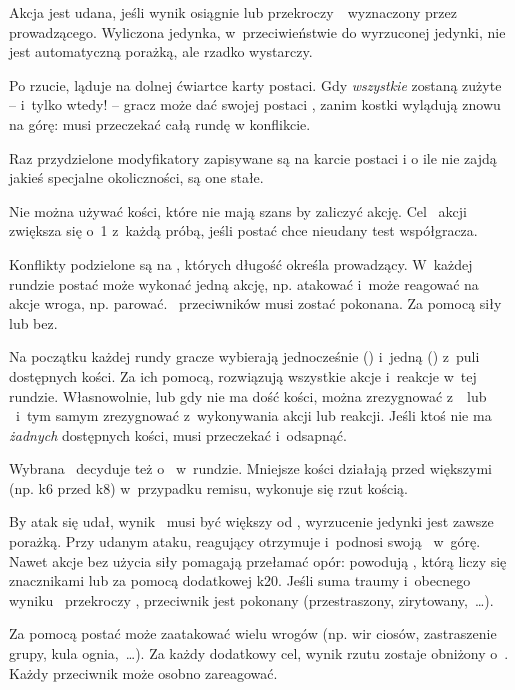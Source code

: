 {		\noindent
		Akcja jest udana, jeśli wynik osiągnie lub przekroczy \,\TN\ wyznaczony przez prowadzącego. Wyliczona jedynka, w~przeciwieństwie do wyrzuconej jedynki, nie jest automatyczną porażką, ale rzadko wystarczy.

		\nipajinTableTargets

		\noindent
		Po rzucie,  ląduje na dolnej ćwiartce karty postaci. Gdy \emph{wszystkie} zostaną zużyte -- i~tylko wtedy! -- gracz może dać swojej postaci , zanim kostki wylądują znowu na górę: musi przeczekać całą rundę w konflikcie.

		Raz przydzielone modyfikatory zapisywane są na karcie postaci i o ile nie zajdą jakieś specjalne okoliczności, są one stałe.

		Nie można używać kości, które nie mają szans by zaliczyć akcję. Cel \TN\ akcji zwiększa się o~1 z~każdą próbą, jeśli postać chce  nieudany test współgracza.


		\noindent
		Konflikty podzielone są na , których długość określa prowadzący. W~każdej rundzie postać może wykonać jedną akcję, np. atakować i~może reagować na akcje wroga, np. parować. \HD\ przeciwników musi zostać pokonana. Za pomocą siły lub bez.

		Na początku każdej rundy gracze wybierają jednocześnie  (\AD) i~jedną  (\RD) z~puli dostępnych kości. Za ich pomocą, rozwiązują wszystkie akcje i~reakcje w~tej rundzie. Własnowolnie, lub gdy nie ma dość kości, można zrezygnować z~\AD\ lub \RD\ i~tym samym zrezygnować z~wykonywania akcji lub reakcji. Jeśli ktoś nie ma \emph{żadnych} dostępnych kości, musi przeczekać i~odsapnąć.

		Wybrana \AD\ decyduje też o~ w~rundzie. Mniejsze kości działają przed większymi (np. k6 przed k8) w~przypadku remisu, wykonuje się rzut kością.

		By atak się udał, wynik \AD\ musi być większy od \RD, wyrzucenie jedynki jest zawsze porażką. Przy udanym ataku, reagujący otrzymuje  i~podnosi swoją \HD\ w~górę. Nawet akcje bez użycia siły pomagają przełamać opór: powodują , którą liczy się znacznikami lub za pomocą dodatkowej k20. Jeśli suma traumy i~obecnego wyniku \HD\ przekroczy \HD, przeciwnik jest pokonany (przestraszony, zirytowany,~\ldots).

		Za pomocą  postać może zaatakować wielu wrogów (np. wir ciosów, zastraszenie grupy, kula ognia,~\ldots). Za każdy dodatkowy cel, wynik rzutu zostaje obniżony o~. Każdy przeciwnik może osobno zareagować.

}
